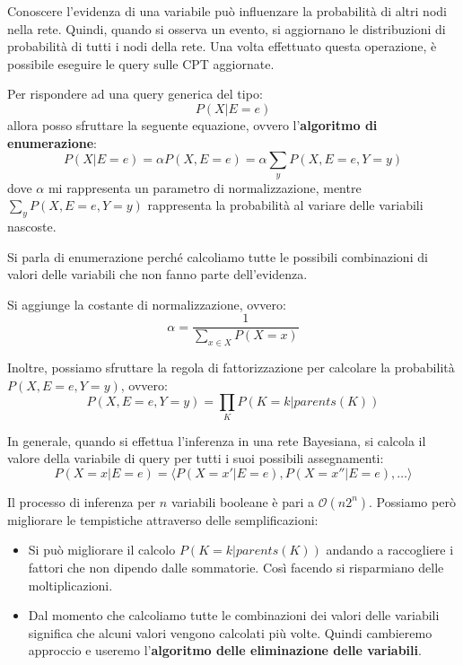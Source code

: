 Conoscere l'evidenza di una variabile può influenzare la probabilità di altri nodi
nella rete. Quindi, quando si osserva un evento, si aggiornano le distribuzioni
di probabilità di tutti i nodi della rete. Una volta effettuato questa operazione,
è possibile eseguire le query sulle CPT aggiornate.

Per rispondere ad una query generica del tipo:
\begin{equation*}
    P(X|E=e)
\end{equation*}
allora posso sfruttare la seguente equazione, ovvero l'\textbf{algoritmo di
    enumerazione}:
\begin{equation}
    P(X|E = e) = \alpha P(X,E = e) = \alpha \sum_{y} P(X,E = e, Y = y)
\end{equation}
dove $\alpha$ mi rappresenta un parametro di normalizzazione, mentre $\sum_{y}
    P(X,E = e, Y = y)$ rappresenta la probabilità al variare delle variabili nascoste.

Si parla di enumerazione perché calcoliamo tutte le possibili combinazioni di valori
delle variabili che non fanno parte dell'evidenza.
\begin{nota}
    Si aggiunge la costante di normalizzazione, ovvero:
    \begin{equation}
        \alpha = \frac{1}{\sum_{x\in X}P(X = x)}
    \end{equation}
\end{nota}
Inoltre, possiamo sfruttare la regola di fattorizzazione per calcolare la probabilità
$P(X,E=e,Y=y)$, ovvero:
\begin{equation}
    P(X,E=e,Y=y) = \prod_{K} P(K=k | parents(K))
\end{equation}

In generale, quando si effettua l'inferenza in una rete Bayesiana, si calcola il
valore della variabile di query per tutti i suoi possibili assegnamenti:
\begin{equation*}
    P(X=x|E=e) = \langle P(X = x'|E = e), P(X = x''|E = e),\dots \rangle
\end{equation*}

Il processo di inferenza per $n$ variabili booleane è pari a $\mathcal{O}(n2^n)$.
Possiamo però migliorare le tempistiche attraverso delle semplificazioni:
\begin{itemize}
    \item Si può migliorare il calcolo $P(K=k | parents(K))$ andando a raccogliere
          i fattori che non dipendo dalle sommatorie. Così facendo si risparmiano
          delle moltiplicazioni.
    \item Dal momento che calcoliamo tutte le combinazioni dei valori delle
          variabili significa che alcuni valori vengono calcolati più volte.
          Quindi cambieremo approccio e useremo l'\textbf{algoritmo delle
              eliminazione delle variabili}.
\end{itemize}

